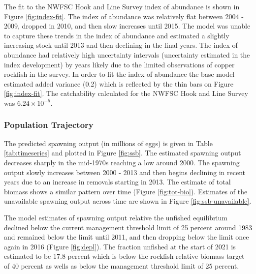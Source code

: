 \documentclass[11pt,
  english,
  a4paper,
]{article}
\begin{document}
\leavevmode\tagmcend\tagstructend\par


The fit to the NWFSC Hook and Line Survey index of abundance is shown in Figure \ref{fig:index-fit}. The index of abundance was relatively flat between 2004 - 2009, dropped in 2010, and then slow increases until 2015. The model was unable to capture these trends in the index of abundance and estimated a slightly increasing stock until 2013 and then declining in the final years. The index of abundance had relatively high uncertainty intervals (uncertainty estimated in the index development) by years likely due to the limited observations of copper rockfish in the survey. In order to fit the index of abundance the base model estimated added variance (0.2) which is reflected by the thin bars on Figure \ref{fig:index-fit}. The catchability calculated for the NWFSC Hook and Line Survey was \ensuremath{6.24\times 10^{-5}}.

\leavevmode\tagmcend\tagstructend\par


\hypertarget{population-trajectory}{%
\subsubsection{Population Trajectory}\label{population-trajectory}}

\leavevmode\tagmcend\tagstructend


The predicted spawning output (in millions of eggs) is given in Table \ref{tab:timeseries} and plotted in Figure \ref{fig:ssb}. The estimated spawning output decreases sharply in the mid-1970s reaching a low around 2000. The spawning output slowly increases between 2000 - 2013 and then begins declining in recent years due to an increase in removals starting in 2013. The estimate of total biomass shows a similar pattern over time (Figure \ref{fig:tot-bio}). Estimates of the unavailable spawning output across time are shown in Figure \ref{fig:ssb-unavailable}.

\leavevmode\tagmcend\tagstructend\par


The model estimates of spawning output relative the unfished equilibrium declined below the current management threshold limit of 25 percent around 1983 and remained below the limit until 2011, and then dropping below the limit once again in 2016 (Figure \ref{fig:depl}). The fraction unfished at the start of 2021 is estimated to be 17.8 percent which is below the rockfish relative biomass target of 40 percent as wells as below the management threshold limit of 25 percent.
\end{document}
